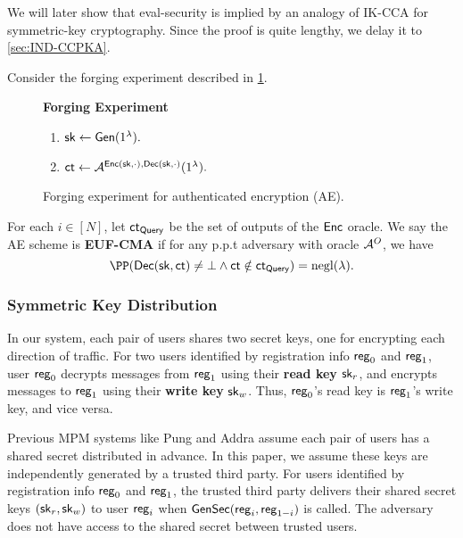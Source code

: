 We will later show that eval-security is implied by an analogy of IK-CCA \cite[Definition 1]{BBDP01keyprivate} for symmetric-key cryptography. Since the proof is quite lengthy, we delay it to \cref{sec:IND-CCPKA}.

\begin{definition}
\label{defn:AE-unforgability}
Consider the forging experiment described in \cref{expr:AE-forging}.

\begin{figure}[ht!]
\begin{framed}
\textbf{Forging Experiment}
\begin{enumerate}
    \item ${\mathsf{sk}} \leftarrow \mathsf{Gen}(1^{\lambda}).$
    \item $\mathsf{ct} \leftarrow \mathcal{A}^{\mathsf{Enc}({\mathsf{sk}}, \cdot), \mathsf{Dec}({\mathsf{sk}}, \cdot)}(1^{\lambda}).$
\end{enumerate}
\end{framed}
\caption{Forging experiment for authenticated encryption (AE).}
\label{expr:AE-forging}
\end{figure}

For each $i \in [N]$, let $\mathsf{ct}_{\mathsf{Query}}$ be the set of outputs of the $\mathsf{Enc}$ oracle. We say the AE scheme is \textbf{EUF-CMA} if for any p.p.t adversary with oracle $\mathcal{A}^O$, we have
$$\PP(\dec(\sk, \ct) \neq \bot \land \ct \notin \ct_{\query}) = \negl(\lambda).$$
\end{definition}

\subsubsection{Symmetric Key Distribution}
\label{subsec:key-distribution}
In our system, each pair of users shares two secret keys, one for encrypting each direction of traffic. For two users identified by registration info $\mathsf{reg}_0$ and $\mathsf{reg}_1$, user $\mathsf{reg}_0$ decrypts messages from $\mathsf{reg}_1$ using their \textbf{read key} ${\mathsf{sk}}_r$, and encrypts messages to $\mathsf{reg}_1$ using their \textbf{write key} ${\mathsf{sk}}_w$. Thus, $\mathsf{reg}_0$'s read key is $\mathsf{reg}_1$'s write key, and vice versa.

Previous MPM systems like Pung and Addra assume each pair of users has a shared secret distributed in advance.  In this paper, we assume these keys are independently generated by a trusted third party.  For users identified by registration info $\mathsf{reg}_0$ and $\mathsf{reg}_1$, the trusted third party delivers their shared secret keys $({\mathsf{sk}}_r, {\mathsf{sk}}_w)$ to user $\mathsf{reg}_i$ when $\mathsf{GenSec}(\mathsf{reg}_i, \mathsf{reg}_{1 - i})$ is called. The adversary does not have access to the shared secret between trusted users.

